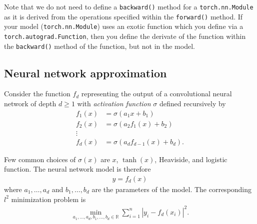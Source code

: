 \documentclass[
]{article}
\begin{document}
Note that we do not need to define a \texttt{backward()} method for a
\texttt{torch.nn.Module} as it is derived from the operations specified
within the \texttt{forward()} method. If your model
(\texttt{torch.nn.Module}) uses an exotic function which you define via
a \texttt{torch.autograd.Function}, then you define the derivate of the
function within the \texttt{backward()} method of the function, but not
in the model.

\hypertarget{neural-network-approximation}{%
\subsection{Neural network
approximation}\label{neural-network-approximation}}

Consider the function \(f_d\) representing the output of a convolutional
neural network of depth \(d \ge 1\) with \emph{activation function}
\(\sigma\) defined recursively by \begin{align*}
    f_1(x) &= \sigma(a_1 x + b_1)
    \\
    f_2(x) &= \sigma(a_2 f_1(x) + b_2)
    \\
    \vdots
    \\
    f_d(x) &= \sigma(a_d f_{d-1}(x) + b_d).
\end{align*}

Few common choices of \(\sigma(x)\) are \(x\), \(\tanh(x)\), Heaviside,
and logistic function. The neural network model is therefore
\begin{align*}
    y = f_d(x)
\end{align*} where \(a_1, \dots, a_d\) and \(b_1, \dots, b_d\) are the
parameters of the model. The corresponding \(l^2\) minimization problem
is \begin{align*}
    \min_{a_1, \dots, a_d, b_1, \dots, b_d \in \mathbb{R}} \sum_{i=1}^{n} \left\lvert y_i - f_d(x_i)\right\rvert^2.
\end{align*}
\end{document}
